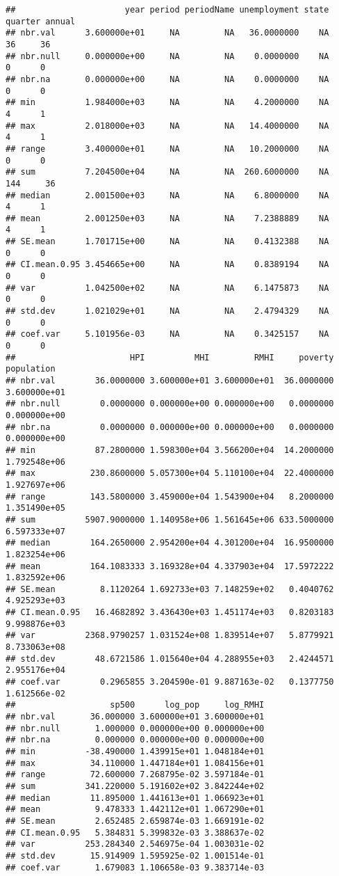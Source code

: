 \documentclass[
]{article}
\begin{document}
\begin{verbatim}
##                      year period periodName unemployment state quarter annual
## nbr.val      3.600000e+01     NA         NA   36.0000000    NA      36     36
## nbr.null     0.000000e+00     NA         NA    0.0000000    NA       0      0
## nbr.na       0.000000e+00     NA         NA    0.0000000    NA       0      0
## min          1.984000e+03     NA         NA    4.2000000    NA       4      1
## max          2.018000e+03     NA         NA   14.4000000    NA       4      1
## range        3.400000e+01     NA         NA   10.2000000    NA       0      0
## sum          7.204500e+04     NA         NA  260.6000000    NA     144     36
## median       2.001500e+03     NA         NA    6.8000000    NA       4      1
## mean         2.001250e+03     NA         NA    7.2388889    NA       4      1
## SE.mean      1.701715e+00     NA         NA    0.4132388    NA       0      0
## CI.mean.0.95 3.454665e+00     NA         NA    0.8389194    NA       0      0
## var          1.042500e+02     NA         NA    6.1475873    NA       0      0
## std.dev      1.021029e+01     NA         NA    2.4794329    NA       0      0
## coef.var     5.101956e-03     NA         NA    0.3425157    NA       0      0
##                       HPI          MHI         RMHI     poverty   population
## nbr.val        36.0000000 3.600000e+01 3.600000e+01  36.0000000 3.600000e+01
## nbr.null        0.0000000 0.000000e+00 0.000000e+00   0.0000000 0.000000e+00
## nbr.na          0.0000000 0.000000e+00 0.000000e+00   0.0000000 0.000000e+00
## min            87.2800000 1.598300e+04 3.566200e+04  14.2000000 1.792548e+06
## max           230.8600000 5.057300e+04 5.110100e+04  22.4000000 1.927697e+06
## range         143.5800000 3.459000e+04 1.543900e+04   8.2000000 1.351490e+05
## sum          5907.9000000 1.140958e+06 1.561645e+06 633.5000000 6.597333e+07
## median        164.2650000 2.954200e+04 4.301200e+04  16.9500000 1.823254e+06
## mean          164.1083333 3.169328e+04 4.337903e+04  17.5972222 1.832592e+06
## SE.mean         8.1120264 1.692733e+03 7.148259e+02   0.4040762 4.925293e+03
## CI.mean.0.95   16.4682892 3.436430e+03 1.451174e+03   0.8203183 9.998876e+03
## var          2368.9790257 1.031524e+08 1.839514e+07   5.8779921 8.733063e+08
## std.dev        48.6721586 1.015640e+04 4.288955e+03   2.4244571 2.955176e+04
## coef.var        0.2965855 3.204590e-01 9.887163e-02   0.1377750 1.612566e-02
##                   sp500      log_pop     log_RMHI
## nbr.val       36.000000 3.600000e+01 3.600000e+01
## nbr.null       1.000000 0.000000e+00 0.000000e+00
## nbr.na         0.000000 0.000000e+00 0.000000e+00
## min          -38.490000 1.439915e+01 1.048184e+01
## max           34.110000 1.447184e+01 1.084156e+01
## range         72.600000 7.268795e-02 3.597184e-01
## sum          341.220000 5.191602e+02 3.842244e+02
## median        11.895000 1.441613e+01 1.066923e+01
## mean           9.478333 1.442112e+01 1.067290e+01
## SE.mean        2.652485 2.659874e-03 1.669191e-02
## CI.mean.0.95   5.384831 5.399832e-03 3.388637e-02
## var          253.284340 2.546975e-04 1.003031e-02
## std.dev       15.914909 1.595925e-02 1.001514e-01
## coef.var       1.679083 1.106658e-03 9.383714e-03
\end{verbatim}
\end{document}
